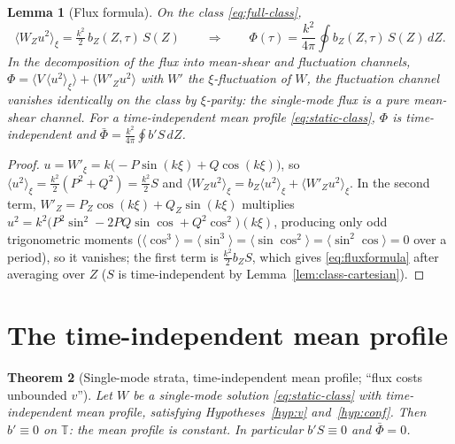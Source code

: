 \documentclass[11pt]{amsart}
\newtheorem{theorem}{Theorem}[section]
\newtheorem{lemma}[theorem]{Lemma}
\theoremstyle{definition}
\theoremstyle{remark}
\newcommand{\T}{\mathbb{T}}
\newcommand{\Fbar}{\bar\Phi}
\newcommand{\mean}[1]{\langle #1\rangle}
\begin{document}
\begin{lemma}[Flux formula]\label{lem:flux}
On the class \eqref{eq:full-class},
\begin{equation}\label{eq:fluxformula}
  \mean{W_Zu^2}_\xi=\tfrac{k^2}2\,b_Z(Z,\tau)\,S(Z)
  \qquad\Longrightarrow\qquad
  \Phi(\tau)=\frac{k^2}{4\pi}\oint b_Z(Z,\tau)\,S(Z)\,dZ .
\end{equation}
In the decomposition of the flux into mean-shear and fluctuation
channels, $\Phi=\mean{V\,\mean{u^2}_\xi}+\mean{W'_Zu^2}$ with $W'$ the
$\xi$-fluctuation of $W$, the fluctuation channel vanishes identically
on the class by $\xi$-parity: the single-mode flux is a pure mean-shear
channel. For a time-independent mean profile \eqref{eq:static-class},
$\Phi$ is time-independent and $\Fbar=\frac{k^2}{4\pi}\oint b'S\,dZ$.
\end{lemma}

\begin{proof}
$u=W'_\xi=k\bigl(-P\sin(k\xi)+Q\cos(k\xi)\bigr)$, so
$\mean{u^2}_\xi=\tfrac{k^2}2(P^2+Q^2)=\tfrac{k^2}2S$ and
$\mean{W_Zu^2}_\xi=b_Z\mean{u^2}_\xi+\mean{W'_Zu^2}_\xi$. In the second
term, $W'_Z=P_Z\cos(k\xi)+Q_Z\sin(k\xi)$ multiplies
$u^2=k^2\bigl(P^2\sin^2-2PQ\sin\cos+Q^2\cos^2\bigr)(k\xi)$, producing
only odd trigonometric moments
($\mean{\cos^3}=\mean{\sin^3}=\mean{\sin\cos^2}=\mean{\sin^2\cos}=0$
over a period), so it vanishes; the first term is $\tfrac{k^2}2b_ZS$,
which gives \eqref{eq:fluxformula} after averaging over $Z$ ($S$ is
time-independent by Lemma~\ref{lem:class-cartesian}).
\end{proof}

\section{The time-independent mean profile}\label{sec:static}

\begin{theorem}[Single-mode strata, time-independent mean profile;
``flux costs unbounded $v$'']\label{thm:static}
Let $W$ be a single-mode solution \eqref{eq:static-class} with
time-independent mean profile, satisfying
Hypotheses~\ref{hyp:v} and~\ref{hyp:conf}. Then $b'\equiv0$ on $\T$:
the mean profile is constant. In particular $b'S\equiv0$ and $\Fbar=0$.
\end{theorem}
\end{document}
